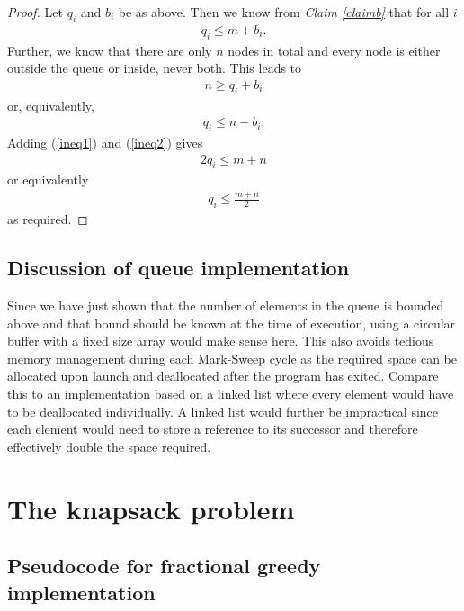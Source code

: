 \documentclass{article}
\begin{document}
\begin{proof}
    Let $q_i$ and $b_i$ be as above. Then we know from \emph{Claim \ref{claimb}}
    that for all $i$
    \begin{align}
        \label{ineq1}
        q_i \leq m + b_i.
    \end{align}
    Further, we know that there are only $n$ nodes in total and every node
    is either outside the queue or inside, never both. This leads to
    \begin{align*}
        n \geq q_i + b_i
    \end{align*}
    or, equivalently,
    \begin{align}
        \label{ineq2}
        q_i \leq n-b_i.
    \end{align}
    Adding (\ref{ineq1}) and (\ref{ineq2}) gives
    \begin{align*}
        2q_i \leq m + n
    \end{align*}
    or equivalently
    \begin{align*}
        q_i \leq \frac{m+n}{2}
    \end{align*}
    as required.
\end{proof}

\subsection{Discussion of queue implementation}

Since we have just shown that the number of elements in the queue is bounded
above and that bound should be known at the time of execution, using a
circular buffer with a fixed size array would make sense here. This also avoids 
tedious memory management during each Mark-Sweep cycle as the required
space can be allocated upon launch and deallocated after the program has exited.
Compare this to an implementation based on a linked list where every element would
have to be deallocated individually. A linked list would further be impractical
since each element would need to store a reference to its successor and therefore
effectively double the space required.


\section{The knapsack problem}


\subsection{Pseudocode for fractional greedy implementation}
\end{document}
